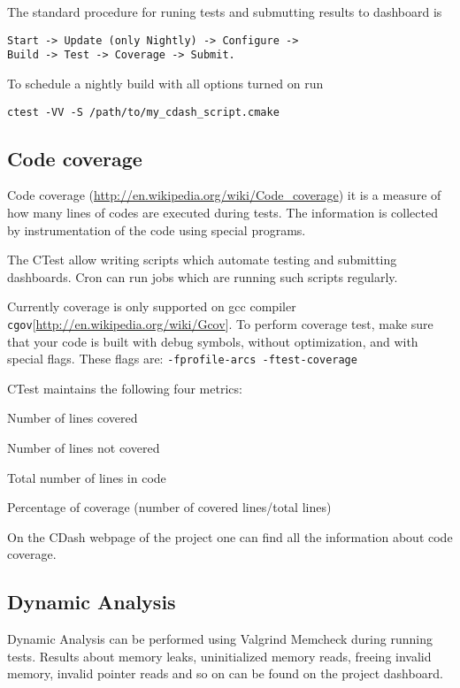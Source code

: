 \documentclass[a4paper,10pt]{article}
\begin{document}
The standard procedure for runing tests and submutting results to dashboard is
\begin{verbatim}
Start -> Update (only Nightly) -> Configure -> 
Build -> Test -> Coverage -> Submit.
\end{verbatim}


To schedule a nightly build with all options turned on run 
\begin{verbatim}
ctest -VV -S /path/to/my_cdash_script.cmake
\end{verbatim}

\subsection{Code coverage}

Code coverage (\url{http://en.wikipedia.org/wiki/Code_coverage}) it is a measure of how many lines of codes are executed during tests. The information is collected by instrumentation of the code using special programs.

The CTest allow writing scripts which automate testing and submitting dashboards. Cron can run jobs which are running such scripts regularly.

Currently coverage is only supported on gcc compiler \texttt{cgov}[\url{http://en.wikipedia.org/wiki/Gcov}]. To perform coverage test, make sure that your code is built with debug symbols, without optimization, and with special flags. These flags are:
\texttt{-fprofile-arcs -ftest-coverage}

CTest maintains the following four metrics:
\begin{compactitem}
\item Number of lines covered
\item Number of lines not covered
\item Total number of lines in code
\item Percentage of coverage (number of covered lines/total lines)
\end{compactitem}


On the CDash webpage of the project one can find all the information about code coverage.


\subsection{Dynamic Analysis}

Dynamic Analysis can be performed using Valgrind Memcheck during running tests. Results about memory leaks, uninitialized memory reads, freeing invalid memory, invalid pointer reads and so on can be found on the project dashboard.
\end{document}
